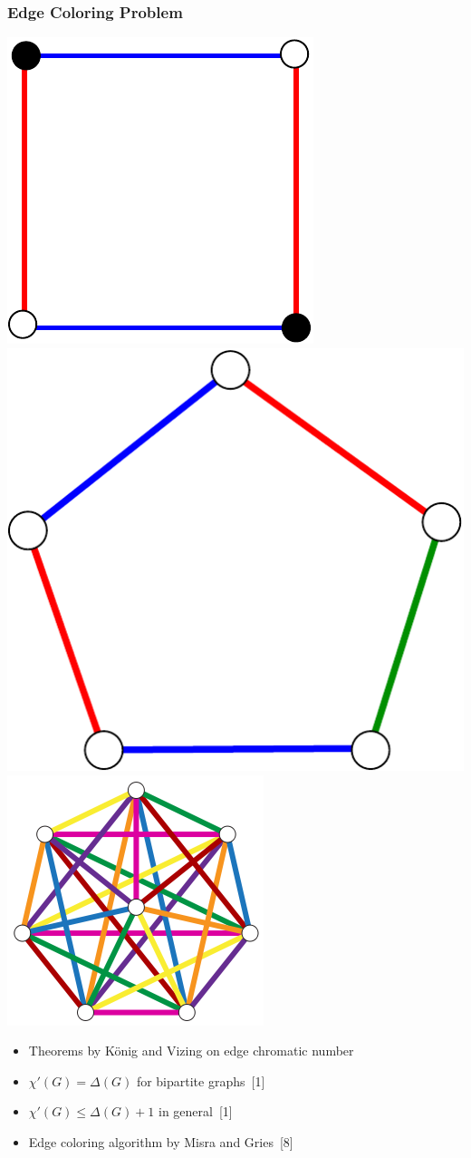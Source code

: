 \documentclass[titlepage,german,presentation]{beamer}
\begin{document}
  
\begin{frame}
\frametitle{Edge Coloring Problem}

\begin{center}
\includegraphics[height=0.25\textwidth]{square}\quad
\includegraphics[height=0.25\textwidth]{pentagon}\quad
\includegraphics[height=0.3\textwidth]{K7.png}

\end{center}


\begin{itemize}
\item Theorems by K\"{o}nig and Vizing on edge chromatic number
\item $\chi'(G) = \Delta(G)$ for bipartite graphs~[1]
\item $\chi'(G) \leq \Delta(G) + 1$ in general~[1]
\item Edge coloring algorithm by Misra and Gries~[8]
\end{itemize}

\end{frame}
\end{document}
